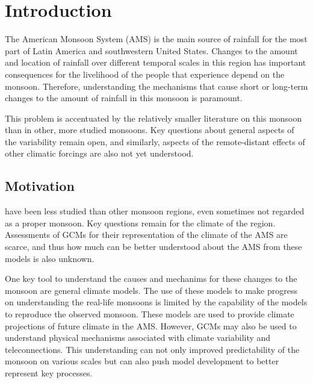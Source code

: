 

\chapter{\label{ch:1-intro}Introduction} 




The American Monsoon System (AMS) is the main source of rainfall for the most part of Latin America and southwestern United States. Changes to the amount and location of rainfall over different temporal scales in this region has important consequences for the livelihood of the people that experience depend on the monsoon. Therefore, understanding the mechanisms that cause short or long-term changes to the amount of rainfall in this monsoon is paramount. 

This problem is accentuated by the relatively smaller literature on this monsoon than in other, more studied monsoons. Key questions about general aspects of the variability remain open, and similarly, aspects of the remote-distant effects of other climatic forcings are also not yet understood.

\section{Motivation}

have been less studied than other monsoon regions, even sometimes not regarded as a proper monsoon. Key questions remain for the climate of the region. 
Assessments of GCMs for their representation of the climate of the AMS are scarce, and thus how much can be better understood about the AMS from these models is also unknown. 

One key tool to understand the causes and mechanims for these changes to the monsoon are general climate models. The use of these models to make progress on understanding the real-life monsoons is limited by the capability of the models to reproduce the observed monsoon.  These models are used to provide climate projections of future climate in the AMS. However, GCMs may also be used to understand physical mechanisms associated with climate variability and teleconnections. This understanding can not only improved predictability of the monsoon on various scales but can also push model development to better represent key processes.

